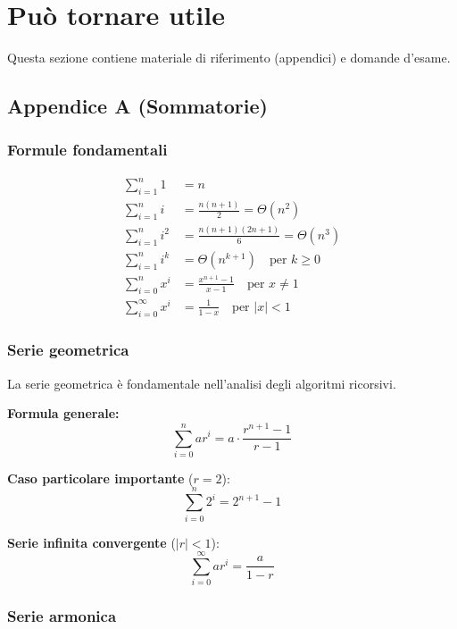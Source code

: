 \section{Può tornare utile}

\begin{softnote}
	Questa sezione contiene materiale di riferimento (appendici) e domande d'esame.
\end{softnote}

\subsection{Appendice A (Sommatorie)}

\subsubsection{Formule fondamentali}

\begin{align*}
	\sum_{i=1}^{n} 1 &= n \\
	\sum_{i=1}^{n} i &= \frac{n(n+1)}{2} = \Theta(n^2) \\
	\sum_{i=1}^{n} i^2 &= \frac{n(n+1)(2n+1)}{6} = \Theta(n^3) \\
	\sum_{i=1}^{n} i^k &= \Theta(n^{k+1}) \quad \text{per } k \geq 0 \\
	\sum_{i=0}^{n} x^i &= \frac{x^{n+1}-1}{x-1} \quad \text{per } x \neq 1 \\
	\sum_{i=0}^{\infty} x^i &= \frac{1}{1-x} \quad \text{per } |x| < 1
\end{align*}

\subsubsection{Serie geometrica}

\begin{nota}
	La serie geometrica è fondamentale nell'analisi degli algoritmi ricorsivi.
	
	\textbf{Formula generale:}
	\[
	\sum_{i=0}^{n} ar^i = a \cdot \frac{r^{n+1}-1}{r-1}
	\]
	
	\textbf{Caso particolare importante} ($r = 2$):
	\[
	\sum_{i=0}^{n} 2^i = 2^{n+1} - 1
	\]
	
	\textbf{Serie infinita convergente} ($|r| < 1$):
	\[
	\sum_{i=0}^{\infty} ar^i = \frac{a}{1-r}
	\]
\end{nota}

\subsubsection{Serie armonica}

